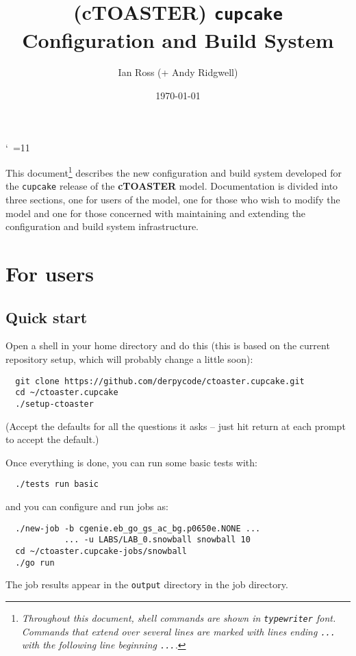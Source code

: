 \documentclass[a4paper,10pt,article]{memoir}
\title{(cTOASTER) \texttt{cupcake} Configuration and Build System}
\author{Ian Ross (+ Andy Ridgwell)}
\date{\today}
\begin{document}
\catcode`~=11    %

\maketitle

\noindent This document\footnote{\emph{Throughout this document, shell commands are shown in 
\texttt{typewriter} font.  Commands that extend over several lines 
are marked with lines ending \texttt{...} with the following line 
beginning \texttt{...}.}}  describes the new configuration and build system 
developed for the \texttt{cupcake} release of the \textbf{cTOASTER} model. 
Documentation is divided into three sections, one for users of the 
model, one for those who wish to modify the model and one for those 
concerned with maintaining and extending the configuration and build 
system infrastructure.


\chapter{For users}

\section{Quick start}

Open a shell in your home directory and do this (this is based on the current repository setup, which will probably change a little soon):
\begin{verbatim}
  git clone https://github.com/derpycode/ctoaster.cupcake.git
  cd ~/ctoaster.cupcake
  ./setup-ctoaster
\end{verbatim}
(Accept the defaults for all the questions it asks -- just hit return at each prompt to accept the default.)

\noindent Once everything is done, you can run some basic tests with:
\begin{verbatim}
  ./tests run basic
\end{verbatim}
and you can configure and run jobs as:
\begin{verbatim}
  ./new-job -b cgenie.eb_go_gs_ac_bg.p0650e.NONE ...
            ... -u LABS/LAB_0.snowball snowball 10
  cd ~/ctoaster.cupcake-jobs/snowball
  ./go run
\end{verbatim}
The job results appear in the \texttt{output} directory in the job
directory.
\end{document}
